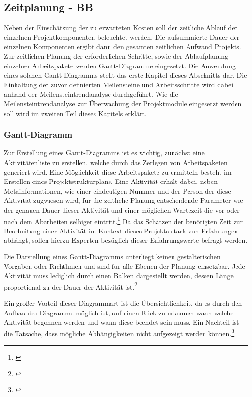
\subsection{Zeitplanung - BB}

Neben der Einschätzung der zu erwarteten Kosten soll der zeitliche Ablauf der einzelnen Projektkomponenten beleuchtet werden. Die aufsummierte Dauer der einzelnen Komponenten ergibt dann den gesamten zeitlichen Aufwand Projekts. Zur zeitlichen Planung der erforderlichen Schritte, sowie der Ablaufplanung einzelner Arbeitspakete werden Gantt-Diagramme eingesetzt. Die Anwendung eines solchen Gantt-Diagramms stellt das erste Kapitel dieses Abschnitts dar. Die Einhaltung der zuvor definierten Meilensteine und Arbeitsschritte wird dabei anhand der Meilensteintrendanalyse durchgeführt. Wie die Meilensteintrendanalyse zur Überwachung der Projektmodule eingesetzt werden soll wird im zweiten Teil dieses Kapitels erklärt.

\subsubsection{Gantt-Diagramm}
Zur Erstellung eines Gantt-Diagramms ist es wichtig, zunächst eine Aktivitätenliste zu erstellen, welche durch das Zerlegen von Arbeitspaketen generiert wird. Eine Möglichkeit diese Arbeitspakete zu ermitteln besteht im Erstellen eines Projektstrukturplans. Eine Aktivität erhält dabei, neben Metainformationen, wie einer eindeutigen Nummer und der Person der diese Aktivität zugwiesen wird, für die zeitliche Planung entscheidende Parameter wie der genauen Dauer dieser Aktivität und einer möglichen Wartezeit die vor oder nach dem Abarbeiten selbiger eintritt.\footnote{\cite{kraus_projekt_2010}}  Da das Schätzen der benötigten Zeit zur Bearbeitung einer Aktivität im Kontext dieses Projekts stark von Erfahrungen abhängt, sollen hierzu Experten bezüglich dieser Erfahrungswerte befragt werden.

Die Darstellung eines Gantt-Diagramms unterliegt keinen gestalterischen Vorgaben oder Richtlinien und sind für alle Ebenen der Planung einsetzbar. Jede Aktivität muss lediglich durch einen Balken dargestellt werden, dessen Länge proportional zu der Dauer der Aktivität ist.\footnote{\cite{jakoby_intensivtraining_2015}}

Ein großer Vorteil dieser Diagrammart ist die Übersichtlichkeit, da es durch den Aufbau des Diagramms möglich ist, auf einen Blick zu erkennen wann welche Aktivität begonnen werden und wann diese beendet sein muss. Ein Nachteil ist die Tatsache, dass mögliche Abhängigkeiten nicht aufgezeigt werden können.\footnote{\cite{kraus_projekt_2010}}

